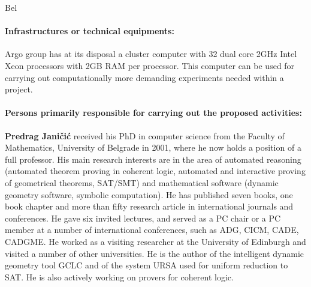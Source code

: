 \begin{sitedescription}{Bel}
  \paragraph*{Infrastructures or technical equipments:}

  \begin{compactitem}
  \item Argo group has at its disposal a cluster computer with 32 dual core
  2GHz Intel Xeon processors with 2GB RAM per processor. This computer
  can be used for carrying out computationally more demanding
  experiments needed within a project.
  \end{compactitem}
  
  \paragraph*{Persons primarily responsible for carrying out the proposed activities:}
  
  \begin{compactitem} %
    
  \item{\bf Predrag Janičić} received his PhD in computer science from
    the Faculty of Mathematics, University of Belgrade in 2001, where
    he now holds a position of a full professor. His main research
    interests are in the area of automated reasoning (automated
    theorem proving in coherent logic, automated and interactive
    proving of geometrical theorems, SAT/SMT) and mathematical
    software (dynamic geometry software, symbolic computation). He has
    published seven books, one book chapter and more than fifty
    research article in international journals and conferences. He
    gave six invited lectures, and served as a PC chair or a PC member
    at a number of international conferences, such as ADG, CICM, CADE,
    CADGME. He worked as a visiting researcher at the University of
    Edinburgh and visited a number of other universities. He is the
    author of the intelligent dynamic geometry tool GCLC and of the
    system URSA used for uniform reduction to SAT. He is also actively
    working on provers for coherent logic.


\end{compactitem}
\end{sitedescription}

